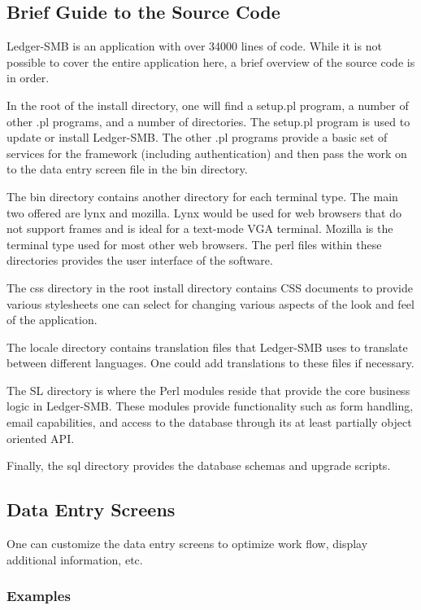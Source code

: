 \documentclass{article}
\begin{document}
\subsection{Brief Guide to the Source Code}
Ledger-SMB is an application with over 34000 lines of code.  While it is not
possible to cover the entire application here, a brief overview of the source
code is in order.

In the root of the install directory, one will find a setup.pl program, a number
of other .pl programs, and a number of directories.  The setup.pl program is
used to update or install Ledger-SMB.  The other .pl programs provide a basic
set of services for the framework (including authentication) and then pass the
work on to the data entry screen file in the bin directory.

The bin directory contains another directory for each terminal type.  The main
two offered are lynx and mozilla.  Lynx would be used for web browsers that do
not support frames and is ideal for a text-mode VGA terminal.  Mozilla is the
terminal type used for most other web browsers.  The perl files within these
directories provides the user interface of the software.

The css directory in the root install directory contains CSS documents to
provide various stylesheets one can select for changing various aspects of the
look and feel of the application.

The locale directory contains translation files that Ledger-SMB uses to
translate between different languages.  One could add translations to these
files if necessary.

The SL directory is where the Perl modules reside that provide the core business
logic in Ledger-SMB.  These modules provide functionality such as form handling,
email capabilities, and access to the database through its at least partially
object oriented API.

Finally, the sql directory provides the database schemas and upgrade scripts.

\subsection{Data Entry Screens}

One can customize the data entry screens to optimize work flow, display
additional information, etc.

\subsubsection{Examples}
\end{document}

